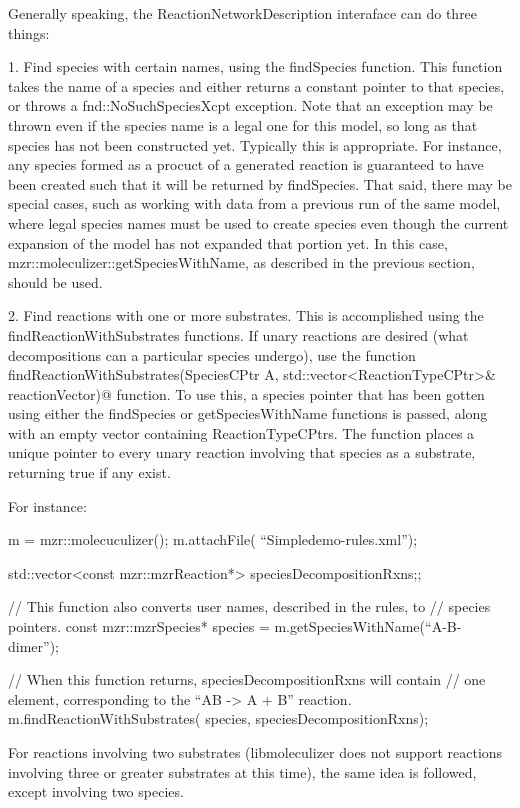 Generally speaking, the ReactionNetworkDescription interaface can do
three things:

1.
Find species with certain names, using the findSpecies function.  This
function takes the name of a species and either returns a constant
pointer to that species, or throws a fnd::NoSuchSpeciesXcpt
exception.  Note that an exception may be thrown even if the species
name is a legal one for this model, so long as that species has not
been constructed yet.  Typically this is appropriate.  For instance,
any species formed as a procuct of a generated reaction is guaranteed
to have been created such that it will be returned by findSpecies.
That said, there may be special cases, such as working with data from
a previous run of the same model, where legal species names must be
used to create species even though the current expansion of the model
has not expanded that portion yet.  In this case,
mzr::moleculizer::getSpeciesWithName, as described in the previous
section, should be used.  

2.  Find reactions with one or more substrates.
This is accomplished using the findReactionWithSubstrates functions.
If unary reactions are desired (what decompositions can a particular
species undergo), use the function 
\lstinline@bool findReactionWithSubstrates(SpeciesCPtr A, std::vector<ReactionTypeCPtr>& reactionVector)@ function.  To use 
this, a species pointer that has been gotten using either the
findSpecies or getSpeciesWithName functions is passed, along with an
empty vector containing ReactionTypeCPtrs.  The function places a
unique pointer to every unary reaction involving that species as a
substrate, returning true if any exist.  

For instance:
\begin{ExampleCPP}
m = mzr::molecuculizer();
m.attachFile( ``Simpledemo-rules.xml''); 

std::vector<const mzr::mzrReaction*> speciesDecompositionRxns;;

// This function also converts user names, described in the rules, to
// species pointers.
const mzr::mzrSpecies* species = m.getSpeciesWithName(``A-B-dimer'');

// When this function returns, speciesDecompositionRxns will contain
// one element, corresponding to the ``AB -> A + B'' reaction.  
m.findReactionWithSubstrates( species, speciesDecompositionRxns);
\end{ExampleCPP}

For reactions involving two substrates (libmoleculizer does not
support reactions involving three or greater substrates at this time),
the same idea is followed, except involving two species.  

